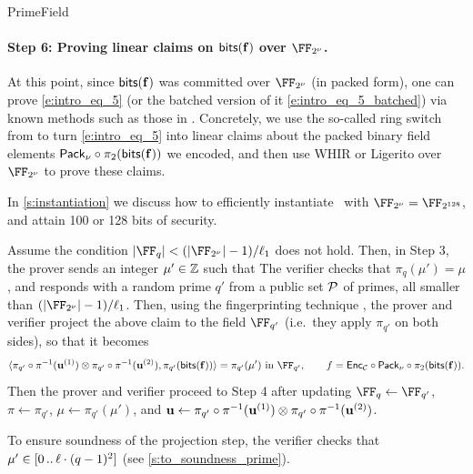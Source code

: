 \begin{lncsmove}{PrimeField}
 \paragraph{Step 6: Proving linear claims on $\mathsf{bits}(\mathbf{f})$ over $\comfield$.} At this point, since $\mathsf{bits}(\mathbf{f})$ was committed over $\comfield$ (in packed form), one can prove \eqref{e:intro_eq_5} (or the batched version of it \eqref{e:intro_eq_5_batched}) via known methods such as those in \cite{binius,binius2,flock}. Concretely, we use the so-called ring switch from \cite{binius,binius2} to turn \eqref{e:intro_eq_5} into linear claims about the packed binary field elements $\mathsf{Pack}_\nu\circ\pi_2(\mathsf{bits}(\mathbf{f}))$ we encoded, and then use WHIR or Ligerito \cite{whir,Ligerito} over $\comfield$ to prove these claims. 


\bigskip       

 
    In \cref{s:instantiation} we discuss how to efficiently instantiate \ftwoz \ with $\comfield=\FF_{2^{128}}$, and attain 100 or 128 bits of security.





\begin{remark}\label{r:large_prime_field_in_BitZ_PCS}
    Assume the condition $|\FF_q|< \fieldboundsizeexponent$ does not hold. Then, in Step 3, the prover sends an integer $\mu'\in \mathbb{Z}$ such that
    The verifier checks that  $\pi_q(\mu')=\mu$, and responds with a random prime $q'$ from a public set $\mathcal{P}$ of primes, all smaller than $\fieldboundsizeexponent$. Then, using the fingerprinting technique \cite{zaratan},  the prover and verifier project the above claim  to the field $\FF_{q'}$ (i.e.\ they apply $\pi_{q'}$ on both sides), so that it becomes
        \begin{equation}\label{e:to_projected_claim}\langle  \pi_{q'}\circ \pi^{-1}(\uu^{(1)})\otimes  \pi_{q'}\circ\pi^{-1}(\uu^{(2)}),  \pi_{q'}(\bitstext(\bff))\rangle = \pi_{q'}(\mu') \ \text{in } \FF_{q'}, \qquad f = \Enc_\cC\circ \pack \circ \pi_2(\bitstext(\bff)).\end{equation}  
        Then the prover and verifier proceed to Step 4 after updating $\FF_{q} \gets \FF_{q'}$, $\pi\gets \pi_{q'}$, $\mu \gets \pi_{q'}(\mu')$, and $\mathbf{u}\gets \pi_{q'}\circ \pi^{-1}(\mathbf{u}^{(1)}) \otimes \pi_{q'}\circ \pi^{-1}(\mathbf{u}^{(2)})$.
        
    To ensure soundness of the projection step, the verifier checks that $\mu'\in [0 \, .. \, \ell\cdot (q-1)^2]$  (see \cref{s:to_soundness_prime}).
\end{remark}



\end{lncsmove}
